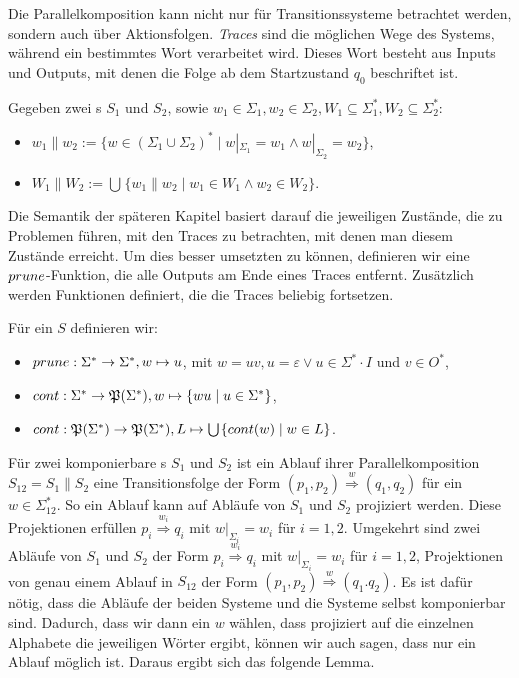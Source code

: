 Die Parallelkomposition kann nicht nur für Transitionssysteme betrachtet
werden, sondern auch über Aktionsfolgen. \emph{Traces} sind die möglichen Wege
des Systems, während ein bestimmtes Wort verarbeitet wird. Dieses Wort besteht
aus Inputs und Outputs, mit denen die Folge ab dem Startzustand $q_0$
beschriftet ist.

\begin{Def}
  Gegeben zwei \EIO{}s $S_1$ und $S_2$, sowie $w_1\in\Sigma _1, w_2\in\Sigma
  _2, W_1\subseteq\Sigma _1^*, W_2\subseteq\Sigma _2^*$:
  \begin{itemize}
    \item $w_1\| w_2:=\{w\in (\Sigma _1\cup\Sigma _2)^*\mid w|_{\Sigma _1}=w_1\wedge
      w|_{\Sigma _2}=w_2\}$,
    \item $W_1\| W_2:=\bigcup\hspace{1pt}\{w_1\| w_2\mid w_1\in W_1\wedge w_2\in W_2\}$.
  \end{itemize}
\end{Def}

Die Semantik der späteren Kapitel basiert darauf die jeweiligen Zustände, die
zu Problemen führen, mit den Traces zu betrachten, mit denen man diesem
Zustände erreicht. Um dies besser umsetzten zu können, definieren wir eine
$prune{}$-Funktion, die alle Outputs am Ende eines Traces entfernt. Zusätzlich
werden Funktionen definiert, die die Traces beliebig fortsetzen.

\begin{Def}
  Für ein \EIO{} $S$ definieren wir:
  \begin{itemize}
    \item $prune{}:\Sigma ^*\rightarrow\Sigma ^*, w\mapsto u$, mit $w=uv,
      u=\varepsilon\vee u\in\Sigma ^*\cdot I$ und $v\in O^*$,
    \item $cont{}:\Sigma ^*\rightarrow\mathfrak{P}(\Sigma ^*),
      w\mapsto\{wu\mid u\in\Sigma ^*\}$,
    \item $cont{}:\mathfrak{P}(\Sigma ^*)\rightarrow\mathfrak{P}(\Sigma ^*),
      L\mapsto\bigcup\hspace{1pt}\{cont{}(w)\mid w\in L\}$.
  \end{itemize}
\end{Def}

Für zwei komponierbare \EIO{}s $S_1$ und $S_2$ ist ein Ablauf ihrer
Parallelkomposition $S_{12}=S_1\| S_2$ eine Transitionsfolge der Form $(p_1,p_2)
\overset{w}{\Rightarrow} (q_1,q_2)$ für ein $w\in\Sigma_{12}^*$. So ein Ablauf
kann auf Abläufe von $S_1$ und $S_2$ projiziert werden. Diese Projektionen
erfüllen $p_i \overset{w_i}{\Rightarrow} q_i$ mit $w|_{\Sigma
_i}=w_i$ für $i=1,2$. Umgekehrt sind zwei Abläufe von $S_1$ und $S_2$ der Form
$p_i \overset{w_i}{\Rightarrow} q_i$ mit $w| _{\Sigma _i}= w_i$ für $i=1,2$,
Projektionen von genau einem Ablauf in $S_{12}$ der Form $(p_1,p_2)
\overset{w}{\Rightarrow} (q_1.q_2)$. Es ist dafür nötig, dass die Abläufe der
beiden Systeme und die Systeme selbst komponierbar sind. Dadurch, dass wir dann
ein $w$ wählen, dass projiziert auf die einzelnen Alphabete die jeweiligen
Wörter ergibt, können wir auch sagen, dass nur ein Ablauf möglich ist. Daraus
ergibt sich das folgende Lemma.

